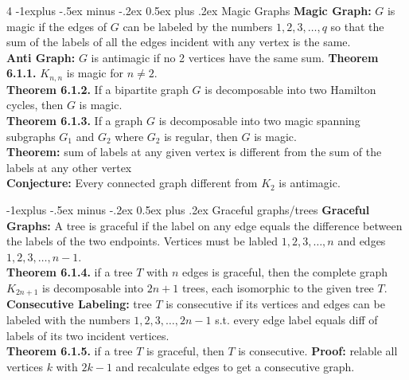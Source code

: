 \documentclass[letterpaper, 8pt]{extarticle}
\makeatletter
\renewcommand{\section}{\@startsection{section}{1}{0mm}%
	{-1explus -.5ex minus -.2ex}%
	{0.5ex plus .2ex}%
	{\normalfont\normalsize\bfseries}}
\makeatother
\begin{document}
\begin{multicols*}{4}
	\section{Magic Graphs}
	\textbf{Magic Graph:} $G$ is magic if the edges of $G$ can be labeled by the numbers $1,2,3,\dots, q$ so that the sum of the labels of all the edges incident with any vertex is the same. \\
	\textbf{Anti Graph:} $G$ is antimagic if no 2 vertices have the same sum.
	\textbf{Theorem 6.1.1.} $K_{n,n}$ is magic for $n \ne 2$. \\
	\textbf{Theorem 6.1.2.} If a bipartite graph $G$ is decomposable into two Hamilton cycles, then $G$ is magic. \\
	\textbf{Theorem 6.1.3.} If a graph $G$ is decomposable into two magic spanning subgraphs $G_1$ and $G_2$ where $G_2$ is regular, then $G$ is magic. \\
	\textbf{Theorem:} sum of labels at any given vertex is different from the sum of the labels at any other vertex \\
	\textbf{Conjecture:} Every connected graph different from $K_2$ is antimagic.

	\section{Graceful graphs/trees}
	\textbf{Graceful Graphs:} A tree is graceful if the label on any edge equals the difference between the labels of the two endpoints. Vertices must be labled $1,2,3,\dots,n$ and edges $1,2,3,\dots,n-1$. \\
	\textbf{Theorem 6.1.4.} if a tree $T$ with $n$ edges is graceful, then the complete graph $K_{2n+1}$ is decomposable into $2n+1$ trees, each isomorphic to the given tree $T$. \\
	\textbf{Consecutive Labeling:} tree $T$ is consecutive if its vertices and edges can be labeled with the numbers $1,2,3,\dots, 2n-1$ s.t. every edge label equals diff of labels of its two incident vertices. \\
	\textbf{Theorem 6.1.5.} if a tree $T$ is graceful, then $T$ is consecutive. \textbf{Proof:} relable all vertices $k$ with $2k-1$ and recalculate edges to get a consecutive graph.


\end{multicols*}
\end{document}
